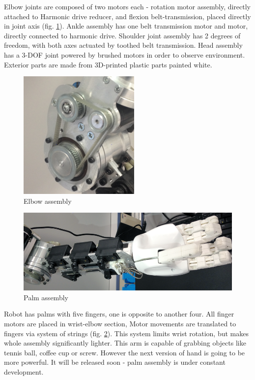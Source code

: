 \documentclass[letterpaper, 10 pt, conference]{ieeeconf}  %
\begin{document}
Elbow joints are composed of two motors each - rotation motor assembly, directly
attached to Harmonic drive reducer, and flexion belt-transmission, placed
directly in joint axis (fig. \ref{img:joints}).
Ankle assembly has one belt transmission motor and motor, directly connected
to harmonic drive.
Shoulder joint assembly has 2 degrees of freedom, with both axes actuated by
toothed belt transmission.
Head assembly has a 3-DOF joint powered by brushed
motors in order to observe environment.
Exterior parts are made from 3D-printed plastic parts painted white.

\begin{figure}[thpb]
\centering

\includegraphics[scale=.5]{ElbowAssembly}
\caption{Elbow assembly}
\label{img:joints}
\end{figure}

\begin{figure}[thpb]
\centering

\includegraphics[scale=0.48]{wrist}
\caption{Palm assembly}
\label{img:wrist}
\end{figure} 

Robot has palms with five fingers, one is opposite to another four. All
finger motors are placed in wrist-elbow section, Motor movements are
translated to fingers via system of strings (fig. \ref{img:wrist}). This system
limits wrist rotation, but makes whole assembly significantly lighter. This arm
is capable of grabbing objects like tennis ball, coffee cup or screw. However the next
version of hand is going to be more powerful. It will be released soon - palm
assembly is under constant development.
\end{document}
